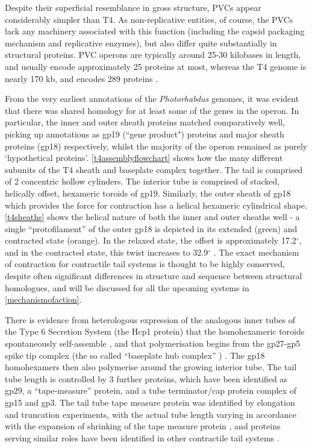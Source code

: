 Despite their superficial resemblance in gross structure, PVCs appear considerably simpler than T4. As non-replicative entities, of course, the PVCs lack any machinery associated with this function (including the capsid packaging mechanism and replicative enzymes), but also differ quite substantially in structural proteins. PVC operons are typically around 25-30 kilobases in length, and usually encode approximately 25 proteins at most, whereas the T4 genome is nearly 170 kb, and encodes 289 proteins \citep{Miller2003}. 

From the very earliest annotations of the \emph{Photorhabdus} genomes, it was evident that there was shared homology for at least some of the genes in the operon. In particular, the inner and outer sheath proteins matched comparatively well, picking up annotations as gp19 (``gene product") proteins and major sheath proteins (gp18) respectively, whilst the majority of the operon remained as purely `hypothetical proteins'.  \vref{t4assemblyflowchart} shows how the many different subunits of the T4 sheath and baseplate complex together. The tail is comprised of 2 concentric hollow cylinders. The interior tube is comprised of stacked, helically offset, hexameric toroids of gp19. Similarly, the outer sheath of gp18 which provides the force for contraction has a helical hexameric cylindrical shape. \vref{t4sheaths} shows the helical nature of both the inner and outer sheaths well - a single ``protofilament'' of the outer gp18 is depicted in its extended (green) and contracted state (orange). In the relaxed state, the offset is approximately 17.2$^{\circ}$, and in the contracted state, this twist increases to 32.9$^{\circ}$ \citep{Kube2015a, Kostyuchenko2005, Leiman2004}. The exact mechanism of contraction for contractile tail systems is thought to be highly conserved, despite often significant differences in structure and sequence between structural homologues, and will be discussed for all the upcoming systems in \vref{mechanismofaction}.

There is evidence from heterologous expression of the analogous inner tubes of the Type 6 Secretion System (the Hcp1 protein) that the homohexameric toroids spontaneously self-assemble \citep{Ballister2008}, and that polymerisation begins from the gp27-gp5 spike tip complex (the so called ``baseplate hub complex'' \citep{Lan2014}) \citep{Kanamaru2002}. The gp18 homohexamers then also polymerise around the growing interior tube. The tail tube length is controlled by 3 further proteins, which have been identified as gp29, a ``tape-measure'' protein, and a tube terminator/cap protein complex of gp15 and gp3. The tail tube tape measure protein was identified by elongation and truncation experiments, with the actual tube length varying in accordance with the expansion of shrinking of the tape measure protein \citep{Abuladze1994}, and proteins serving similar roles have been identified in other contractile tail systems \citep{Katsura1987,Katsura1984, Isao1990}.

